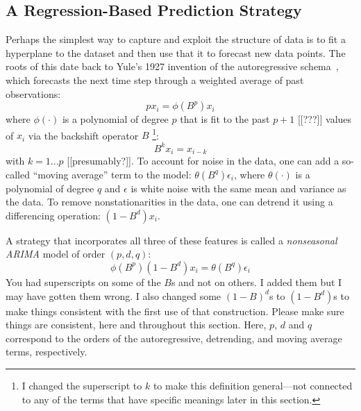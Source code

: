 \subsection{A Regression-Based Prediction Strategy}
\label{sec:arima}




Perhaps the simplest way to capture and exploit the structure of data
is to fit a hyperplane to the dataset and then use that it to forecast
new data points.  The roots of this date back to Yule's 1927 invention
of the autoregressive schema~\cite{weigend93}, which forecasts the
next time step through a weighted average of past observations: $$px_i
= \phi(B^p)x_{i}$$ where $\phi(\cdot)$ is a polynomial of degree $p$
that is fit to the past $p+1$ [[???]] values of $x_i$ via the
backshift operator $B$ \footnote{I changed the superscript to $k$ to
  make this definition general---not connected to any of the terms
  that have specific meanings later in this section.}:
$$B^k x_i = x_{i-k}$$
%
with $k=1...p$ [[presumably?]].  To account for noise in the data, one
can add a so-called ``moving average'' term to the model:
$\theta(B^q)\epsilon_i$, where $\theta(\cdot)$ is a polynomial of
degree $q$ and $\epsilon$ is white noise with the same mean and
variance as the data.
To remove nonstationarities in the data, one can detrend it using a
differencing operation: $(1-B^d)x_i$.  

A strategy that incorporates all three of these features is called a
\emph{nonseasonal ARIMA} model of order $(p,d,q)$:
 $$\phi(B^p)(1-B^d) x_i = \theta(B^q)\epsilon_i$$
%
{\color{red} You had superscripts on some of the $B$s and not on
  others.  I added them but I may have gotten them wrong.  I also
  changed some $(1-B)^d$s to $(1-B^d)$s to make things consistent with
  the first use of that construction.  Please make sure things are
  consistent, here and throughout this section.}  Here, $p$, $d$ and
$q$ correspond to the orders of the autoregressive, detrending, and
moving average terms, respectively.

